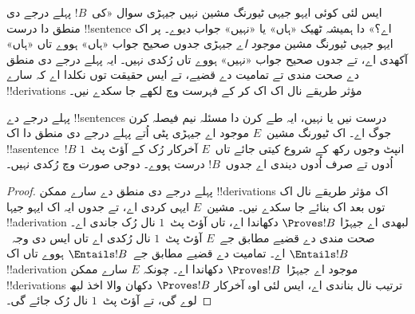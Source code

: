 \documentclass[../../../include/open-logic-section]{subfiles}
\begin{document}
\begin{explain}
ایس لئی کوئی ایہو جیہی ٹیورنگ مشین نہیں جیہڑی
سوال «کی~$!B$ پہلے درجے دی منطق دا
درست !!{sentence} اے؟» دا ہمیشہ ٹھیک
«ہاں» یا «نہیں» جواب دیوے۔ پر اک ایہو جیہی
ٹیورنگ مشین \emph{موجود اے} جیہڑی جدوں صحیح
جواب «ہاں» ہووے تاں «ہاں» آکھدی اے، تے جدوں
صحیح جواب «نہیں» ہووے تاں رُکدی نہیں۔
ایہ پہلے درجے دی منطق دے صحت مندی تے
تمامیت دے قضیے، تے ایس حقیقت توں نکلدا اے
کہ سارے !!{derivation}s مؤثر طریقے نال
اک اک کر کے فہرست وچ لکھے جا سکدے نیں۔
\end{explain}

\begin{thm}
  پہلے درجے دے !!{sentence}s درست نیں یا نہیں، ایہ
  طے کرن دا مسئلہ نیم فیصلہ کرن جوگ اے۔ اک ٹیورنگ مشین~$E$
  موجود اے جیہڑی پٹی اُتے پہلے درجے دی
  منطق دا اک !!a{sentence}~$!B$ انپٹ وجوں
  رکھ کے شروع کیتی جائے تاں~$E$ آخرکار رُک
  کے آؤٹ پٹ~$1$ اُدوں تے صرف اُدوں دیندی اے
  جدوں~$!B$ درست ہووے۔ دوجی صورت وچ رُکدی نہیں۔
\end{thm}

\begin{proof}
  پہلے درجے دی منطق دے سارے ممکن
  !!{derivation}s اک مؤثر طریقے نال اک
  توں بعد اک بنائے جا سکدے نیں۔ مشین~$E$
  ایہی کردی اے، تے جدوں ایہ اک ایہو جیہا
  !!a{derivation} لبھدی اے جیہڑا
  $\Proves
  !B$ دکھاندا اے، تاں آؤٹ پٹ~$1$ نال
  رُک جاندی اے۔ صحت مندی دے قضیے مطابق
  جے~$E$ آؤٹ پٹ~$1$ نال رُکدی اے تاں
  ایس دی وجہ~$\Entails !B$ اے۔
  تمامیت دے قضیے مطابق جے~$\Entails !B$
  ہووے تاں اک !!a{derivation} موجود اے
  جیہڑا~$\Proves !B$ دکھاندا اے۔ چونکہ
  $E$ سارے ممکن !!{derivation}s ترتیب
  نال بناندی اے، ایس لئی اوہ آخرکار
  $\Proves !B$ دکھان والا اخذ لبھ لوے گی،
  تے آؤٹ پٹ~$1$ نال رُک جائے گی۔
\end{proof}
\end{document}
